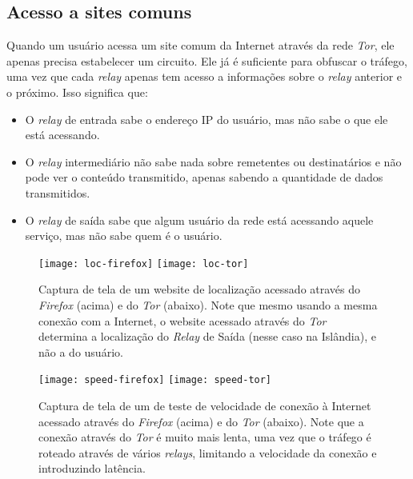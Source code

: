 \subsection{Acesso a sites comuns}

Quando um usuário acessa um site comum da Internet através da rede \textit{Tor}, ele apenas precisa estabelecer um circuito. Ele já é suficiente para obfuscar o tráfego, uma vez que cada \textit{relay} apenas tem acesso a informações sobre o \textit{relay} anterior e o próximo. Isso significa que:

\begin{itemize}
    \item O \textit{relay} de entrada sabe o endereço IP do usuário, mas não sabe o que ele está acessando.
    \item O \textit{relay} intermediário não sabe nada sobre remetentes ou destinatários e não pode ver o conteúdo transmitido, apenas sabendo a quantidade de dados transmitidos.
    \item O \textit{relay} de saída sabe que algum usuário da rede está acessando aquele serviço, mas não sabe quem é o usuário.
\end{itemize}

\begin{figure}
    \centering
    \texttt{[image: loc-firefox]}
    \texttt{[image: loc-tor]}
  
    \caption{Captura de tela de um website de localização acessado através do \textit{Firefox} (acima) e do \textit{Tor} (abaixo). Note que mesmo usando a mesma conexão com a Internet, o website acessado através do \textit{Tor} determina a localização do \textit{Relay} de Saída (nesse caso na Islândia), e não a do usuário.}
    \label{fig:mylocation}
\end{figure}

\begin{figure}
    \centering
    \texttt{[image: speed-firefox]}
    \texttt{[image: speed-tor]}
  
    \caption{Captura de tela de um de teste de velocidade de conexão à Internet acessado através do \textit{Firefox} (acima) e do \textit{Tor} (abaixo). Note que a conexão através do \textit{Tor} é muito mais lenta, uma vez que o tráfego é roteado através de vários \textit{relays}, limitando a velocidade da conexão e introduzindo latência.}
    \label{fig:speedtest}
\end{figure}

